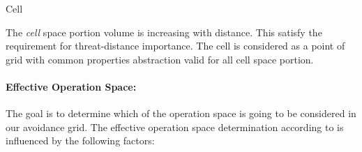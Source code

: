 \begin{definition}{Cell}
\end{definition}

\begin{note}
    The \emph{cell} space portion volume is increasing with distance. This satisfy the requirement for threat-distance importance.  The cell is considered as a point of grid with common properties abstraction valid for all cell space portion.    
\end{note}

\paragraph{Effective Operation Space:} The goal is to determine which of the operation space is going to be considered in our avoidance grid.  The effective operation space determination according to \cite{zaiane2002clustering} is influenced by the following factors:


